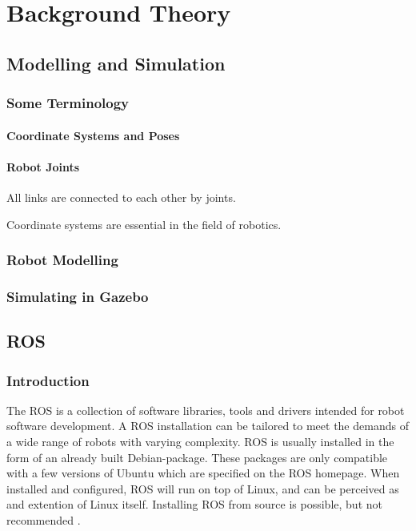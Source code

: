 \chapter{Background Theory}
\label{chp:theory} 



\section{Modelling and Simulation}

\subsection{Some Terminology}

\subsubsection{Coordinate Systems and Poses}

\subsubsection{Robot Joints}

All links are connected to each other by joints. 

Coordinate systems are essential in the field of robotics. 

\subsection{Robot Modelling}

\subsection{Simulating in Gazebo}

\section{ROS}

\subsection{Introduction}

The \ac{ROS} is a collection of software libraries, tools and drivers intended for robot software development. A \ac{ROS} installation can be tailored to meet the demands of a wide range of robots with varying complexity. \ac{ROS} is usually installed in the form of an already built Debian-package. These packages are only compatible with a few versions of Ubuntu which are specified on the \ac{ROS} homepage. When installed and configured, \ac{ROS} will run on top of Linux, and can be perceived as and extention of Linux itself. Installing \ac{ROS} from source is possible, but not recommended \cite{ROS_install}.

